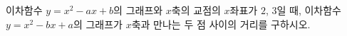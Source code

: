 이차함수 $y=x^2-ax+b$의 그래프와 $x$축의 교점의 $x$좌표가 $2$, $3$일 때, 이차함수 $y=x^2-bx+a$의 그래프가 $x$축과 만나는 두 점 사이의 거리를 구하시오. 
